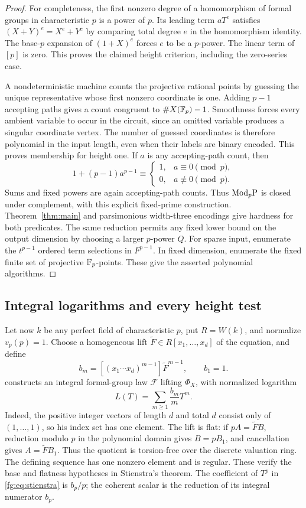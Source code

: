 \begin{proof}
For completeness, the first nonzero degree of a homomorphism of formal
groups in characteristic $p$ is a power of $p$. Its leading term
$aT^e$ satisfies $(X+Y)^e=X^e+Y^e$ by comparing total degree $e$ in the
homomorphism identity. The base-$p$ expansion of $(1+X)^e$ forces $e$ to
be a $p$-power. The linear term of $[p]$ is zero. This proves the claimed
height criterion, including the zero-series case.

A nondeterministic machine counts the projective rational points by
guessing the unique representative whose first nonzero coordinate is
one. Adding $p-1$ accepting paths gives a count congruent to
$\#X(\mathbb F_p)-1$. Smoothness forces every ambient variable to occur in the
circuit, since an omitted variable produces a singular coordinate
vertex. The number of guessed coordinates is therefore polynomial in
the input length, even when their labels are binary encoded.
This proves membership for height one. If $a$ is any accepting-path
count, then
\[
 1+(p-1)a^{p-1}\equiv
 \begin{cases}1,&a\equiv0\pmod p,\\0,&a\not\equiv0\pmod p.
 \end{cases}
\]
Sums and fixed powers are again accepting-path counts. Thus $\mathrm{Mod}_p\mathrm P$ is
closed under complement, with this explicit fixed-prime construction.
Theorem~\ref{thm:main} and parsimonious width-three encodings give
hardness for both predicates. The same reduction permits any fixed
lower bound on the output dimension by choosing a larger $p$-power $Q$.
For sparse input, enumerate the $t^{p-1}$ ordered term selections in
$F^{p-1}$. In fixed dimension, enumerate the fixed finite set of
projective $\mathbb F_p$-points. These give the asserted polynomial algorithms.
\end{proof}

\subsection{Integral logarithms and every height test}
Let now $k$ be any perfect field of characteristic $p$, put $R=W(k)$,
and normalize $v_p(p)=1$. Choose a homogeneous lift
$\widetilde F\in R[x_1,\ldots,x_d]$ of the equation, and define
\[
 b_m=[(x_1\cdots x_d)^{m-1}]\widetilde F^{m-1},\qquad b_1=1.
\]
\citet[Theorem~1, p.~907; specialization on p.~908 and in
\S3.9, p.~914]{fg-stienstra} constructs an integral formal-group law
$\mathcal F$ lifting $\Phi_X$, with normalized logarithm
\begin{equation}\label{fg:eq:stienstra}
 L(T)=\sum_{m\ge1}\frac{b_m}{m}T^m.
\end{equation}
Indeed, the positive integer vectors of length $d$ and total $d$ consist
only of $(1,\ldots,1)$, so his index set has one element. The lift is
flat: if $pA=\widetilde F B$, reduction modulo $p$ in the polynomial
domain gives $B=pB_1$, and cancellation gives $A=\widetilde F B_1$.
Thus the quotient is torsion-free over the discrete valuation ring.
The defining sequence has one nonzero element and is regular. These
verify the base and flatness hypotheses in Stienstra's theorem.
The coefficient of $T^p$ in \eqref{fg:eq:stienstra} is $b_p/p$;
the coherent scalar is the reduction of its integral numerator $b_p$.

